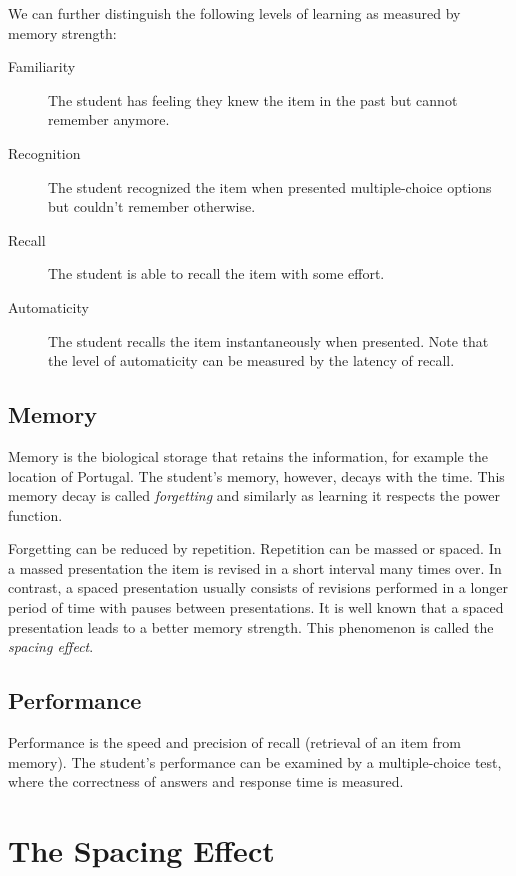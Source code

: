 We can further distinguish the following levels of learning as measured by memory strength:

\begin{description}
  \item[Familiarity] The student has feeling they knew the item in the past but cannot remember anymore.
  \item[Recognition] The student recognized the item when presented multiple-choice options but couldn't remember otherwise.
  \item[Recall] The student is able to recall the item with some effort.
  \item[Automaticity] The student recalls the item instantaneously when presented. Note that the level of automaticity can be measured by the latency of recall.
\end{description}

\subsection{Memory}

Memory is the biological storage that retains the information, for example the location of Portugal. The student's memory, however, decays with the time. This memory decay is called \textit{forgetting} and similarly as learning it respects the power function.

Forgetting can be reduced by repetition. Repetition can be massed or spaced. In a massed presentation the item is revised in a short interval many times over. In contrast, a spaced presentation usually consists of revisions performed in a longer period of time with pauses between presentations. It is well known that a spaced presentation leads to a better memory strength. This phenomenon is called the \textit{spacing effect}.

\subsection{Performance}

Performance is the speed and precision of recall (retrieval of an item from memory). The student's performance can be examined by a multiple-choice test, where the correctness of answers and response time is measured.

\section{The Spacing Effect}

